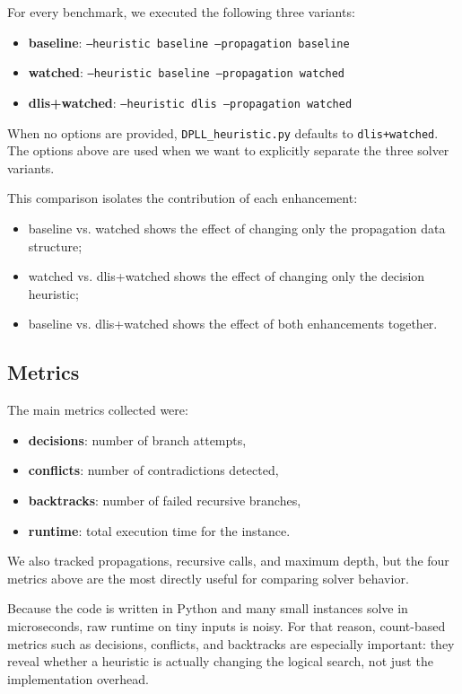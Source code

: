 \documentclass[11pt]{article}
\begin{document}
For every benchmark, we executed the following three variants:

\begin{itemize}
    \item \textbf{baseline}: \texttt{--heuristic baseline --propagation baseline}
    \item \textbf{watched}: \texttt{--heuristic baseline --propagation watched}
    \item \textbf{dlis+watched}: \texttt{--heuristic dlis --propagation watched}
\end{itemize}

When no options are provided, \texttt{DPLL\_heuristic.py} defaults to
\texttt{dlis+watched}. The options above are used when we want to explicitly
separate the three solver variants.

This comparison isolates the contribution of each enhancement:

\begin{itemize}
    \item baseline vs. watched shows the effect of changing only the
    propagation data structure;
    \item watched vs. dlis+watched shows the effect of changing only the
    decision heuristic;
    \item baseline vs. dlis+watched shows the effect of both enhancements
    together.
\end{itemize}

\subsection{Metrics}

The main metrics collected were:
\begin{itemize}
    \item \textbf{decisions}: number of branch attempts,
    \item \textbf{conflicts}: number of contradictions detected,
    \item \textbf{backtracks}: number of failed recursive branches,
    \item \textbf{runtime}: total execution time for the instance.
\end{itemize}

We also tracked propagations, recursive calls, and maximum depth, but the four
metrics above are the most directly useful for comparing solver behavior.

Because the code is written in Python and many small instances solve in
microseconds, raw runtime on tiny inputs is noisy. For that reason, count-based
metrics such as decisions, conflicts, and backtracks are especially important:
they reveal whether a heuristic is actually changing the logical search, not
just the implementation overhead.
\end{document}
